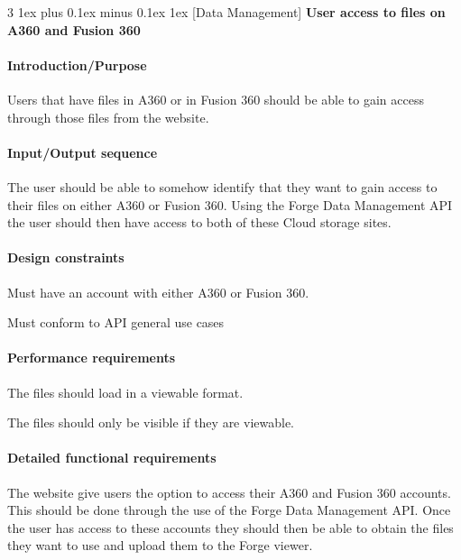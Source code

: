 \documentclass[letterpaper, 10pt, draftclsnofoot, compsoc, onecolumn]{IEEEtran}
\makeatletter
\def\subsubsection{\@startsection{subsubsection}%
                                 {3}%
                                 {\z@}%
                                 {1ex plus 0.1ex minus 0.1ex}%
                                 {1ex}%
                                 {\normalfont\normalsize}}%
\makeatother
\begin{document}

\subsubsection[{Data Management}]{\rmfamily\bfseries\color{black}  
	User access to files on A360 and Fusion 360
}

\paragraph[Introduction/Purpose of this
feature]{\rmfamily\bfseries\color{black}
Introduction/Purpose }
	Users that have files in A360 or in Fusion 360 should be able to gain access through those files from the
	website.

\paragraph[Input/Output sequence]{\rmfamily\bfseries\color{black}
Input/Output sequence }
	The user should be able to somehow identify that they want to gain access to their files on either A360
	or Fusion 360. Using the Forge Data Management API the user should then have access to both of these
	Cloud storage sites.

\paragraph[Design constraints]{\rmfamily\bfseries\color{black} Design
constraints }
	Must have an account with either A360 or Fusion 360. 
	
	Must conform to API general use cases

\paragraph[Performance requirements]{\rmfamily\bfseries\color{black}
Performance requirements }
	The files should load in a viewable format.
	
	The files should only be visible if they are viewable.

\paragraph[Detailed functional requirements]{\rmfamily\bfseries\color{black}
Detailed functional requirements }
	The website give users the option to access their A360 and Fusion 360 accounts. This should be done through
	the use of the Forge Data Management API. Once the user has access to these accounts they should then be 
	able to obtain the files they want to use and upload them to the Forge viewer.
\end{document}
